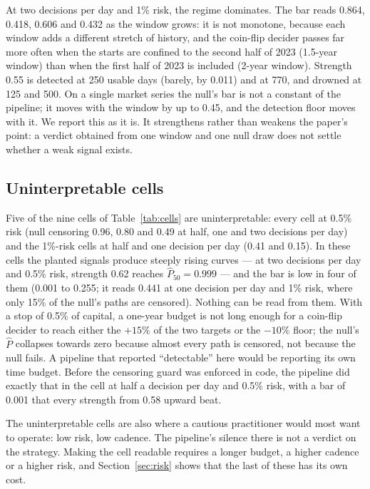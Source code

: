 \documentclass[11pt]{article}
\newcommand{\Pf}{\hat{P}}
\begin{document}
At two decisions per day and 1\% risk, the regime dominates. The bar reads 0.864, 0.418, 0.606 and 0.432 as the window grows: it is not monotone, because each window adds a different stretch of history, and the coin-flip decider passes far more often when the starts are confined to the second half of 2023 (1.5-year window) than when the first half of 2023 is included (2-year window). Strength 0.55 is detected at 250 usable days (barely, by 0.011) and at 770, and drowned at 125 and 500. On a single market series the null's bar is not a constant of the pipeline; it moves with the window by up to 0.45, and the detection floor moves with it. We report this as it is. It strengthens rather than weakens the paper's point: a verdict obtained from one window and one null draw does not settle whether a weak signal exists.

\subsection{Uninterpretable cells}
\label{sec:uninterp}

Five of the nine cells of Table~\ref{tab:cells} are uninterpretable: every cell at 0.5\% risk (null censoring 0.96, 0.80 and 0.49 at half, one and two decisions per day) and the 1\%-risk cells at half and one decision per day (0.41 and 0.15). In these cells the planted signals produce steeply rising curves --- at two decisions per day and 0.5\% risk, strength 0.62 reaches $\Pf_{50} = 0.999$ --- and the bar is low in four of them (0.001 to 0.255; it reads 0.441 at one decision per day and 1\% risk, where only 15\% of the null's paths are censored). Nothing can be read from them. With a stop of 0.5\% of capital, a one-year budget is not long enough for a coin-flip decider to reach either the $+15\%$ of the two targets or the $-10\%$ floor; the null's $\Pf$ collapses towards zero because almost every path is censored, not because the null fails. A pipeline that reported ``detectable'' here would be reporting its own time budget. Before the censoring guard was enforced in code, the pipeline did exactly that in the cell at half a decision per day and 0.5\% risk, with a bar of 0.001 that every strength from 0.58 upward beat.

The uninterpretable cells are also where a cautious practitioner would most want to operate: low risk, low cadence. The pipeline's silence there is not a verdict on the strategy. Making the cell readable requires a longer budget, a higher cadence or a higher risk, and Section~\ref{sec:risk} shows that the last of these has its own cost.
\end{document}
